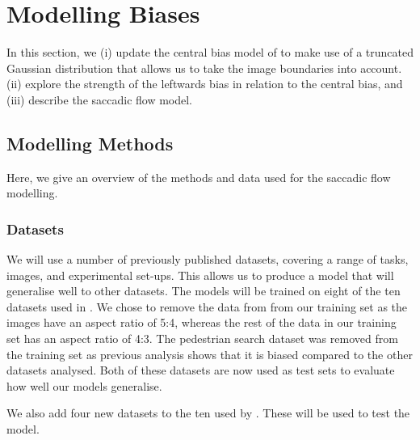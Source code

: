 
\section{Modelling Biases}
\label{sec:biases}

In this section, we (i) update the central bias model of \cite{clarke-tatler2014} to make use of a truncated Gaussian distribution that allows us to take the image boundaries into account. (ii) explore the strength of the leftwards bias in relation to the central bias, and (iii) describe the saccadic flow model. 


\subsection{Modelling Methods}
\label{sec:modellingMethods}

Here, we give an overview of the methods and data used for the saccadic flow modelling.

\subsubsection{Datasets}

We will use a number of previously published datasets, covering a range of tasks, images, and experimental set-ups. This allows us to produce a model that will generalise well to other datasets. The models will be trained on eight of the ten datasets used in \cite{clarke-tatler2014}. We chose to remove the data from \cite{asher2013} from our training set as the images have an aspect ratio of 5:4, whereas the rest of the data in our training set has an aspect ratio of 4:3. The pedestrian search dataset \citep{ehinger2009} was removed from the training set as previous analysis \citep{clarke-tatler2014} shows that it is biased compared to the other datasets analysed. Both of these datasets are now used as test sets to evaluate how well our models generalise. 

We also add four new datasets to the ten used by \cite{clarke-tatler2014}. These will be used to test the model. 

